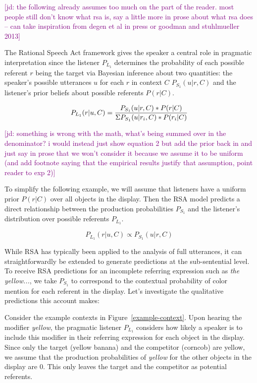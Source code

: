 \documentclass[10pt,letterpaper]{article}
\newcommand{\jd}[1]{\textcolor{Purple}{[jd: #1]}}
\begin{document}
\jd{the following already assumes too much on the part of the reader. most people still don't know what rsa is, say a little more in prose about what rsa does -- can take inspiration from degen et al in press or goodman and stuhlmueller 2013}

The Rational Speech Act framework gives the speaker a central role in pragmatic interpretation since the listener $P_{L_1}$ determines the probability of each possible referent $r$ being the target via Bayesian inference about two quantities: the speaker's possible utterances $u$ for each $r$ in context $C$ $P_{S_1}(u|r,C)$ and the listener's prior beliefs about possible referents $P(r|C)$. 

\begin{equation}
	P_{L_1}(r|u,C) = \frac{P_{S_1}(u|r,C) * P(r|C)}{\Sigma \space P_{S_1}(u|r_{i},C) * P(r_{i}|C)}
\label{eq-prior}
\end{equation}

\jd{something is wrong with the math, what's being summed over in the denominator? i would instead just show equation 2 but add the prior back in and just say in prose that we won't consider it because we assume it to be uniform (and add footnote saying that the empirical results justify that assumption, point reader to exp 2)}

To simplify the following example, we will assume that listeners have a uniform prior $P(r|C)$ over all objects in the display. Then the RSA model predicts a direct relationship between the production probabilities $P_{S_1}$ and the listener's distribution over possible referents $P_{L_1}$. 

\begin{equation}
	P_{L_1}(r|u,C) \propto P_{S_1}(u|r,C)
\label{eq-prior}
\end{equation}

While RSA has typically been applied to the analysis of full utterances, it can straightforwardly be extended to generate predictions at the sub-sentential level. To receive RSA predictions for an incomplete referring expression such as \textit{the yellow...}, we take $P_{S_1}$ to correspond to the contextual probability of color mention for each referent in the display. Let's investigate the qualitative predictions this account makes:

Consider the example contexts in Figure~\ref{example-context}. Upon hearing the modifier \textit{yellow}, the pragmatic listener $P_{L_1}$ considers how likely a speaker is to include this modifier in their referring expression for each object in the display. Since only the target (yellow banana) and the competitor (corncob) are yellow, we assume that the production probabilities of \textit{yellow} for the other objects in the display are 0. This only leaves the target and the competitor as potential referents. 
\end{document}
